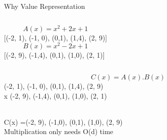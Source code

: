 \documentclass{beamer}
\begin{document}
	    \begin{frame}{Why Value Representation}

                        \begin{columns}
        	               \begin{equation*}
                                    A(x) = x^2 + 2x +1
        	               \end{equation*}			
                         \small  {[(-2, 1), (-1, 0), (0,1), (1,4), (2, 9)]}
                              \begin{equation*}
        				        B(x) = x^2 - 2x + 1
                                \end{equation*}
                         \small  {[(-2, 9), (-1,4), (0,1), (1,0), (2, 1)]}
                                
                            
        			 \end{columns}

            
             \vspace{0.5cm} 
                            \begin{equation*}
                                C(x) = A(x).B(x)
                            \end{equation*}
                    \centering
                         \small  {(-2, 1), (-1, 0), (0,1), (1,4), (2, 9)}\\
                       x  \small  {(-2, 9), (-1,4), (0,1), (1,0), (2, 1)}\\

                        \\
                     C(x) =\small  {(-2, 9), (-1,0), (0,1), (1,0), (2, 9)}\\

                     
                    
                  \vspace{0.5cm}   Multiplication only needs O(d) time
        
	    \end{frame}



      
\end{document}
